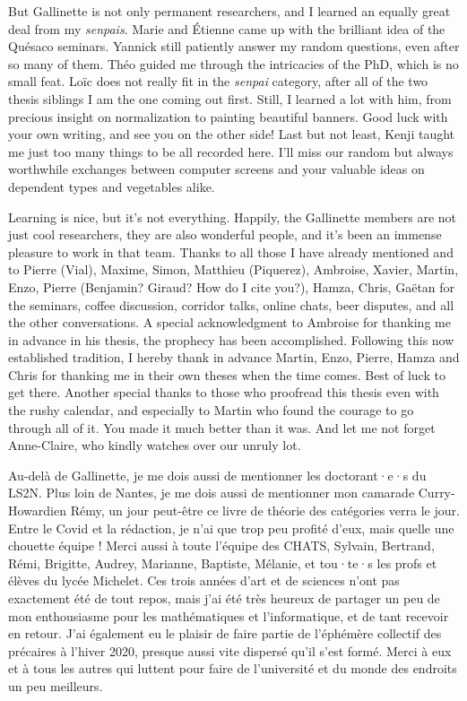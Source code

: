 But Gallinette is not only permanent researchers, and I learned an equally great deal from
my \textit{senpais}. Marie and Étienne came up with the brilliant idea of the Quésaco seminars.
Yannick still patiently answer my random questions, even after so many of them.
Théo guided me through the intricacies of the PhD, which is no small feat.
Loïc does not really fit in the \textit{senpai} category,
after all of the two thesis siblings I am
the one coming out first. Still, I learned a lot with him, from precious insight on
normalization to painting beautiful banners.
Good luck with your own writing, and see you on the other side!
Last but not least, Kenji taught me just too many things to be all recorded here.
I’ll miss our random but always worthwhile exchanges between computer screens and your
valuable ideas on dependent types and vegetables alike.

Learning is nice, but it’s not everything. Happily, the Gallinette members are not just
cool researchers, they are also wonderful people, and it’s been an immense pleasure to work
in that team. Thanks to all those I have already mentioned and to
Pierre (Vial), Maxime, Simon, Matthieu (Piquerez), Ambroise, Xavier, Martin, Enzo,
Pierre (Benjamin? Giraud? How do I cite you?), Hamza, Chris, Gaëtan
for the seminars, coffee discussion, corridor talks, online chats, beer disputes,
and all the other conversations. A special acknowledgment to Ambroise for thanking me in
advance in his thesis, the prophecy has been accomplished.
Following this now established tradition, I hereby thank in advance
Martin, Enzo, Pierre, Hamza and Chris for thanking me in their own theses when the time comes.
Best of luck to get there.
Another special thanks to those who proofread this thesis even with the rushy calendar,
and especially to Martin who found the courage to go through all of it. You made it much
better than it was.
And let me not forget Anne-Claire, who kindly watches over our unruly lot.


Au-delà de Gallinette, je me dois aussi de mentionner les doctorant·e·s du LS2N.
Plus loin de Nantes, je me dois aussi de mentionner mon camarade Curry-Howardien Rémy,
un jour peut-être ce livre de théorie des catégories verra le jour.
Entre le Covid et la rédaction, je n’ai que trop peu profité d’eux, mais quelle
une chouette équipe ! Merci aussi à toute l’équipe des CHATS, Sylvain, Bertrand, Rémi,
Brigitte, Audrey, Marianne, Baptiste, Mélanie, et tou·te·s les profs et élèves du lycée
Michelet. Ces trois années d’art et de sciences n’ont pas exactement été de tout repos,
mais j’ai été très heureux de partager un peu de mon enthousiasme pour
les mathématiques et l’informatique, et de tant recevoir en retour.
J’ai également eu le plaisir de faire partie de l’éphémère collectif des précaires à l’hiver
2020, presque aussi vite dispersé qu’il s’est formé.
Merci à eux et à tous les autres qui luttent pour faire de l’université et
du monde des endroits un peu meilleurs.

